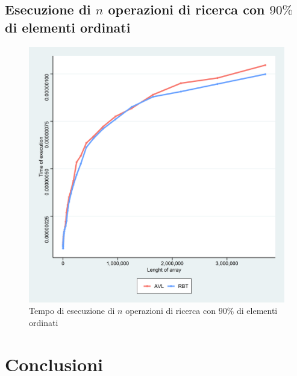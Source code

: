 \documentclass{article}
\begin{document}
	\newpage
	
	\subsection{Esecuzione di $n$ operazioni di ricerca con $90\%$ di elementi ordinati}
	\label{subsection:n_op_ric}
	
	\begin{figure}[h!]
		\centering
  		\includegraphics[width=1 \columnwidth]{Grafici/Grafico_All_find_ordered_AvlRbt.png}
  		\caption{Tempo di esecuzione di $n$ operazioni di ricerca con $90\%$ di elementi ordinati}
  		\label{fig:graph5}
	\end{figure}
	
	\newpage

	\section{Conclusioni}
	
	
\end{document}
